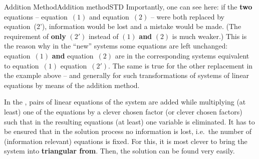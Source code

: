 \begin{MXContent}{Addition Method}{Addition method}{STD}
Importantly, one can see here: if the \textbf{two}
equations -- equation~$(1)$ and equation~$(2)$ -- were both replaced by equation~(2'),
information would be lost and a mistake would be made.
(The requirement of \textbf{only} $(2')$ instead of $(1)$ \textbf{and}
$(2)$ is much weaker.) This is the reason why in the ``new'' systems
some equations are left unchanged: equation~$(1)$ \textbf{and} equation~$(2)$ are
in the corresponding systems equivalent to equation~$(1)$  equation~$(2')$.
The same is true for the other replacement in the example above -- and 
generally for such transformations of systems of linear equations by means 
of the addition method.


\begin{MInfo}
In the , pairs of linear equations of the system 
are added while multiplying (at least) one  of the equations by a clever chosen factor 
(or clever chosen factors) such that in the resulting equations (at least) one variable 
is eliminated. It has to be ensured that in the solution process no information is lost, i.e.\
the number of (information relevant) equations is fixed. For this, it is most clever to bring the 
system into \textbf{triangular from}. Then, the solution can be found very easily.
\end{MInfo}
\end{MXContent}

